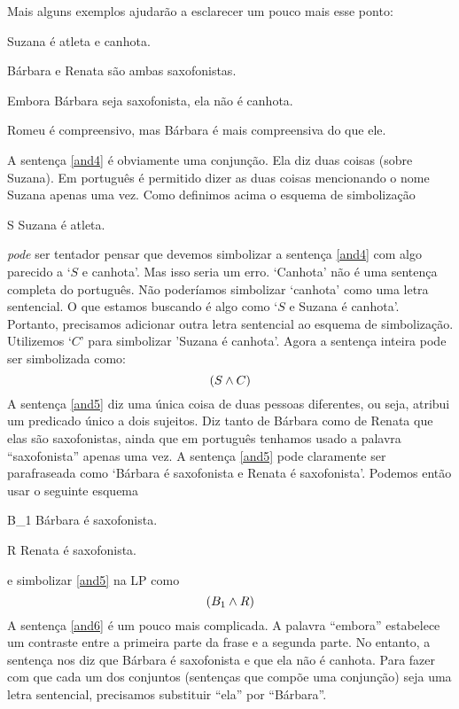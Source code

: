 Mais alguns exemplos ajudarão a esclarecer um pouco mais esse ponto:
	\begin{earg}
		\item[\ex{and4}]Suzana é atleta e canhota.
		\item[\ex{and5}]Bárbara e Renata são ambas saxofonistas.
		\item[\ex{and6}]Embora Bárbara seja saxofonista, ela não é canhota.
		\item[\ex{and7}]Romeu é compreensivo, mas Bárbara é mais compreensiva do que ele.
	\end{earg}
A sentença \ref{and4} é obviamente uma conjunção.
Ela diz duas coisas (sobre Suzana).
Em português é permitido dizer as duas coisas mencionando o nome Suzana apenas uma vez.
Como definimos acima o esquema de simbolização 
	\begin{ekey}
		\item[S] Suzana é atleta.
	\end{ekey}
\emph{pode} ser tentador pensar que devemos simbolizar a sentença \ref{and4} com algo parecido a `$S$ e canhota'.
Mas isso seria um erro.
`Canhota' não é uma sentença completa do português.
Não poderíamos simbolizar `canhota' como uma letra sentencial.
O que estamos buscando é algo como `$S$ e Suzana é canhota'.
Portanto, precisamos adicionar outra letra sentencial ao esquema de simbolização. Utilizemos `$C$' para simbolizar 'Suzana é canhota'.
Agora a sentença inteira pode ser simbolizada como:
$$(S \wedge C)$$	
A sentença \ref{and5} diz uma única coisa de duas pessoas diferentes, ou seja, atribui um predicado único a dois sujeitos.
Diz tanto de Bárbara como de Renata que elas são saxofonistas, ainda que em português tenhamos usado a palavra ``saxofonista'' apenas uma vez.
A sentença \ref{and5} pode claramente ser parafraseada como `Bárbara é saxofonista e Renata é saxofonista'.
Podemos então usar o seguinte esquema
	\begin{ekey}
		\item[B_1] Bárbara é saxofonista.
		\item[R] Renata é saxofonista.
	\end{ekey}
e simbolizar \ref{and5} na LP como
$$(B_1 \wedge R)$$
A sentença \ref {and6} é um pouco mais complicada.
A palavra ``embora'' estabelece um contraste entre a primeira parte da frase e a segunda parte.
No entanto, a sentença nos diz que Bárbara é saxofonista e que ela não é canhota.
Para fazer com que cada um dos conjuntos (sentenças que compõe uma conjunção) seja uma letra sentencial, precisamos substituir ``ela'' por ``Bárbara''.
